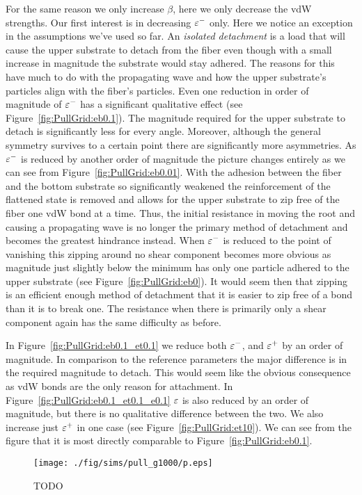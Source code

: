 For the same reason we only increase $\beta$, here we only decrease the vdW strengths. Our first interest is in decreasing $\varepsilon^-$ only. Here we notice an exception in the assumptions we've used so far. An \textit{isolated detachment} is a load that will cause the upper substrate to detach from the fiber even though with a small increase in magnitude the substrate would stay adhered. The reasons for this have much to do with the propagating wave and how the upper substrate's particles align with the fiber's particles. Even one reduction in order of magnitude of $\varepsilon^-$ has a significant qualitative effect (see Figure~\ref{fig:PullGrid:eb0.1}). The magnitude required for the upper substrate to detach is significantly less for every angle. Moreover, although the general symmetry survives to a certain point there are significantly more asymmetries. As $\varepsilon^-$ is reduced by another order of magnitude the picture changes entirely as we can see from Figure~\ref{fig:PullGrid:eb0.01}. With the adhesion between the fiber and the bottom substrate so significantly weakened the reinforcement of the flattened state is removed and allows for the upper substrate to zip free of the fiber one vdW bond at a time. Thus, the initial resistance in moving the root and causing a propagating wave is no longer the primary method of detachment and becomes the greatest hindrance instead. When $\varepsilon^-$ is reduced to the point of vanishing this zipping around no shear component becomes more obvious as magnitude just slightly below the minimum has only one particle adhered to the upper substrate (see Figure~\ref{fig:PullGrid:eb0}). It would seem then that zipping is an efficient enough method of detachment that it is easier to zip free of a bond than it is to break one. The resistance when there is primarily only a shear component again has the same difficulty as before.

In Figure~\ref{fig:PullGrid:eb0.1_et0.1} we reduce both $\varepsilon^-$, and $\varepsilon^+$ by an order of magnitude. In comparison to the reference parameters the major difference is in the required magnitude to detach. This would seem like the obvious consequence as vdW bonds are the only reason for attachment. In Figure~\ref{fig:PullGrid:eb0.1_et0.1_e0.1} $\varepsilon$ is also reduced by an order of magnitude, but there is no qualitative difference between the two. We also increase just $\varepsilon^+$ in one case (see Figure~\ref{fig:PullGrid:et10}). We can see from the figure that it is most directly comparable to Figure~\ref{fig:PullGrid:eb0.1}.

	\begin{figure}
		\begin{center}
			\texttt{[image: ./fig/sims/pull\_g1000/p.eps]}
		\end{center}		
		\caption{ TODO
		\label{fig:PullGrid:g1000}}
	\end{figure}


